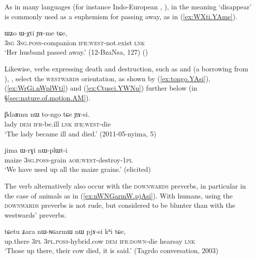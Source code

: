 As in many languages (for instance Indo-European , \citealt[439--440]{liv}),  in the meaning `disappear' is commonly used as a euphemism for passing away, as in (\ref{ex:WXti.YAme}).

 \begin{exe}
\ex \label{ex:WXti.YAme}
\gll  ɯʑo ɯ-χti ɲɤ-me tɕe,  \\
\textsc{3sg} \textsc{3sg}.\textsc{poss}-companion \textsc{ifr}:\textsc{west}-not.exist \textsc{lnk} \\
\glt `Her husband passed away.' (12-BzaNsa, 127) ()
\end{exe} 

Likewise, verbs expressing death and destruction, such as  and  (a borrowing from ), ,  select the \textsc{westwards} orientation, as shown by (\ref{ex:tongo.YAsi}), (\ref{ex:WrGi.nWplWti}) and (\ref{ex:Ctusci.YWNu}) further below (in §\ref{sec:nature.of.motion.AM}).

 \begin{exe}
\ex \label{ex:tongo.YAsi}
\gll βdaʁmu nɯ to-ngo tɕe ɲɤ-si. \\
lady \textsc{dem} \textsc{ifr}-be.ill \textsc{lnk} \textsc{ifr}:\textsc{west}-die \\
\glt `The lady became ill and died.' (2011-05-nyima, 5)
 \end{exe} 
 
  \begin{exe}
\ex \label{ex:WrGi.nWplWti}
\gll  jima ɯ-rɣi nɯ-plɯt-i \\
maize \textsc{3sg}.\textsc{poss}-grain \textsc{aor}:\textsc{west}-destroy-\textsc{1pl} \\
\glt `We have used up all the maize grains.' (elicited)
  \end{exe} 
  
 The verb  alternatively also occur with the \textsc{downwards} preverbs, in particular in the case of animals as in (\ref{ex:nWNGarmW.pjAsi}). With humans, using the \textsc{downwards} preverbs is not rude, but considered to be blunter than with the  westwards' preverbs.
 
\begin{exe}
\ex \label{ex:nWNGarmW.pjAsi}
\gll  tɕetu ʑara nɯ-ɴɢarmɯ nɯ pjɤ-si kʰi tɕe,  \\
up.there \textsc{3pl} \textsc{3pl}.\textsc{poss}-hybrid.cow \textsc{dem} \textsc{ifr}:\textsc{down}-die hearsay \textsc{lnk} \\
\glt `Those up there, their cow died, it is said.' (Tagrdo conversation, 2003)
   \end{exe} 
   

